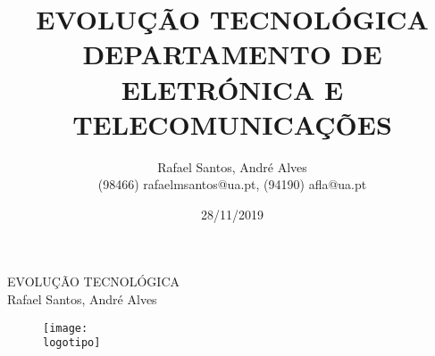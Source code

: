 \documentclass{report}
\begin{document}
%
\def\titulo{EVOLUÇÃO TECNOLÓGICA}
\def\data{28/11/2019}
\def\autores{Rafael Santos, André Alves}
\def\autorescontactos{(98466) rafaelmsantos@ua.pt, (94190) afla@ua.pt}

\def\departamento{DEPARTAMENTO DE ELETRÓNICA E TELECOMUNICAÇÕES}

\def\logotipo{ua.pdf}
%
%
\begin{titlepage}

\begin{center}
%
\vspace*{50mm}
%
{\Huge \titulo}\\ 
%
\vspace{10mm}
%
%
\vspace{10mm}
%
{\LARGE \autores}\\ 
%
\vspace{30mm}
%
\begin{figure}[h]
\center
\texttt{[image: \\logotipo]}
\end{figure}
%
\vspace{30mm}
\end{center}
%
\begin{flushright}
\end{flushright}
\end{titlepage}

\title{%
{\Huge\textbf{\titulo}}\\
{\Large \departamento\\ }
}
%
\author{%
    \autores \\
    \autorescontactos
}
%
\date{\data}
%
\maketitle


\begin{abstract}

\end{abstract}



\tableofcontents
\end{document}

